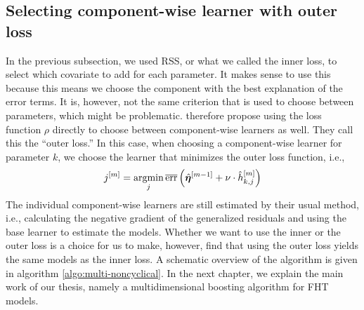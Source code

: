 \subsection{Selecting component-wise learner with outer loss}
In the previous subsection, we used RSS, or what we called the inner loss, to select which covariate to add for each parameter.
It makes sense to use this because this means we choose the component with the best explanation of the error terms.
It is, however, not the same criterion that is used to choose between parameters, which might be problematic.
\citet{thomas2018} therefore propose using the loss function $\rho$ directly to choose between component-wise learners as well.
They call this the ``outer loss.''
In this case, when choosing a component-wise learner for parameter $k$, we choose the learner that minimizes the outer loss function, i.e., 
\begin{equation*}
    j^{[m]}=\operatorname*{argmin}_{j} \overline{\text{err}}\left(\hat{\boldsymbol{\eta}}^{[m-1]} + \nu\cdot \hat{h}^{[m]}_{k,j} \right)
\end{equation*}
The individual component-wise learners are still estimated by their usual method, i.e., calculating the negative gradient of the generalized residuals and using the base learner to estimate the models.
Whether we want to use the inner or the outer loss is a choice for us to make, however, \citet{thomas2018} find that using the outer loss yields the same models as the inner loss.
A schematic overview of the algorithm is given in algorithm \ref{algo:multi-noncyclical}.
In the next chapter, we explain the main work of our thesis, namely a multidimensional boosting algorithm for FHT models.

